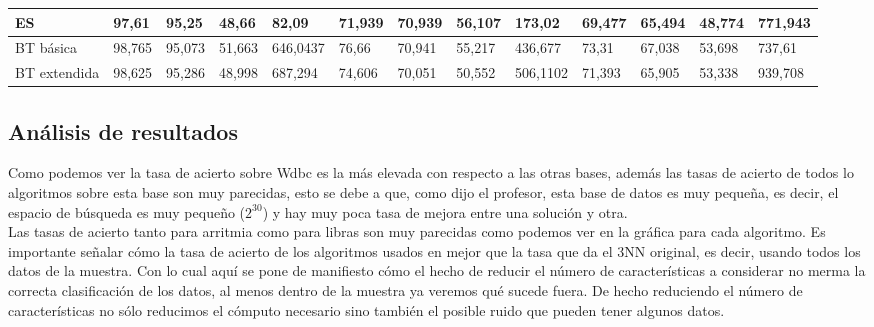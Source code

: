 \documentclass[10pt,a4paper]{article}
\begin{document}
\begin{table}[H]
{\begin{tabular}{lllllllllllll}
\multicolumn{1}{|l|}{ES}                       & \multicolumn{1}{l|}{97,61}         & \multicolumn{1}{l|}{95,25}   & \multicolumn{1}{l|}{48,66}  & \multicolumn{1}{l|}{82,09}        & \multicolumn{1}{l|}{71,939}        & \multicolumn{1}{l|}{70,939}  & \multicolumn{1}{l|}{56,107} & \multicolumn{1}{l|}{173,02}       & \multicolumn{1}{l|}{69,477}        & \multicolumn{1}{l|}{65,494}  & \multicolumn{1}{l|}{48,774} & \multicolumn{1}{l|}{771,943} \\ \hline
\multicolumn{1}{|l|}{BT básica}                & \multicolumn{1}{l|}{98,765}        & \multicolumn{1}{l|}{95,073}  & \multicolumn{1}{l|}{51,663} & \multicolumn{1}{l|}{646,0437}     & \multicolumn{1}{l|}{76,66}         & \multicolumn{1}{l|}{70,941}  & \multicolumn{1}{l|}{55,217} & \multicolumn{1}{l|}{436,677}      & \multicolumn{1}{l|}{73,31}         & \multicolumn{1}{l|}{67,038}  & \multicolumn{1}{l|}{53,698} & \multicolumn{1}{l|}{737,61}  \\ \hline
\multicolumn{1}{|l|}{BT extendida}             & \multicolumn{1}{l|}{98,625}        & \multicolumn{1}{l|}{95,286}  & \multicolumn{1}{l|}{48,998} & \multicolumn{1}{l|}{687,294}      & \multicolumn{1}{l|}{74,606}        & \multicolumn{1}{l|}{70,051}  & \multicolumn{1}{l|}{50,552} & \multicolumn{1}{l|}{506,1102}     & \multicolumn{1}{l|}{71,393}        & \multicolumn{1}{l|}{65,905}  & \multicolumn{1}{l|}{53,338} & \multicolumn{1}{l|}{939,708} \\ \hline
\end{tabular}}
\end{table}

\subsection{\color[rgb]{0.0,0.0,0.51}Análisis de resultados}



Como podemos ver la tasa de acierto sobre Wdbc es la más elevada con respecto a las otras bases, además las tasas de acierto de todos lo algoritmos sobre esta base son muy parecidas, esto se debe a que, como dijo el profesor, esta base de datos es muy pequeña, es decir, el espacio de búsqueda es muy pequeño ($2^{30}$) y hay muy poca tasa de mejora entre una solución y otra.\\

Las tasas de acierto tanto para arritmia como para libras son muy parecidas como podemos ver en la gráfica para cada algoritmo. Es importante señalar cómo la tasa de acierto de los algoritmos usados en mejor que la tasa que da el 3NN original, es decir, usando todos los datos de la muestra. Con lo cual aquí se pone de manifiesto cómo el hecho de reducir el número de características a considerar no merma la correcta clasificación de los datos, al menos dentro de la muestra ya veremos qué sucede fuera. De hecho reduciendo el número de características no sólo reducimos el cómputo necesario sino también el posible ruido que pueden tener algunos datos.\\
\end{document}
